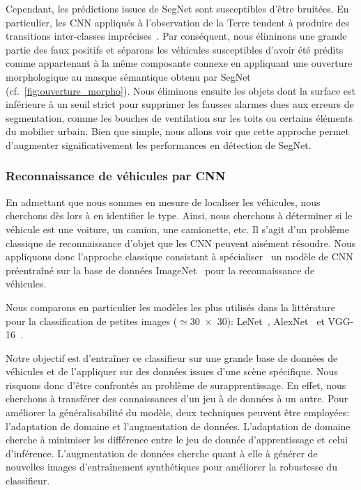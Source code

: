 Cependant, les prédictions issues de SegNet sont susceptibles d'être bruitées. En particulier, les \gls{CNN} appliqués à l'observation de la Terre tendent à produire des transitions inter-classes imprécises~\cite{marmanis_classification_2017}. Par conséquent, nous éliminons une grande partie des faux positifs et séparons les véhicules susceptibles d'avoir été prédits comme appartenant à la même composante connexe en appliquant une ouverture morphologique au masque sémantique obtenu par SegNet (cf.~\cref{fig:ouverture_morpho}). Nous éliminons ensuite les objets dont la surface est inférieure à un seuil strict pour supprimer les fausses alarmes dues aux erreurs de segmentation, comme les bouches de ventilation sur les toits ou certains éléments du mobilier urbain. Bien que simple, nous allons voir que cette approche permet d'augmenter significativement les performances en détection de SegNet.

\subsubsection{Reconnaissance de véhicules par \gls{CNN}}

En admettant que nous sommes en mesure de localiser les véhicules, nous cherchons dès lors à en identifier le type. Ainsi, nous cherchons à déterminer si le véhicule est une voiture, un camion, une camionette, etc. Il s'agit d'un problème classique de reconnaissance d'objet que les \gls{CNN} peuvent aisément résoudre. Nous appliquons donc l'approche classique consistant à spécialiser~\cite{nogueira_towards_2016,zhou_deep_2016} un modèle de \gls{CNN} préentraîné sur la base de données ImageNet~\cite{russakovsky_imagenet_2015} pour la reconnaissance de véhicules.

Nous comparons en particulier les modèles les plus utilisés dans la littérature pour la classification de petites images ($\simeq$\SI{30x30}{\px}): LeNet~\cite{lecun_gradient-based_1998}, \gls{AlexNet}~\cite{krizhevsky_imagenet_2012} et \gls{VGG-16}~\cite{simonyan_very_2015}.

Notre objectif est d'entraîner ce classifieur sur une grande base de données de véhicules et de l'appliquer sur des données issues d'une scène spécifique. Nous risquons donc d'être confrontés au problème de surapprentissage. En effet, nous cherchons à transférer des connaissances d'un jeu à de données à un autre. Pour améliorer la généralisabilité du modèle, deux techniques peuvent être employées: l'adaptation de domaine et l'augmentation de données. L'adaptation de domaine cherche à minimiser les différence entre le jeu de donnée d'apprentissage et celui d'inférence. L'augmentation de données cherche quant à elle à générer de nouvelles images d'entraînement synthétiques pour améliorer la robustesse du classifieur.

